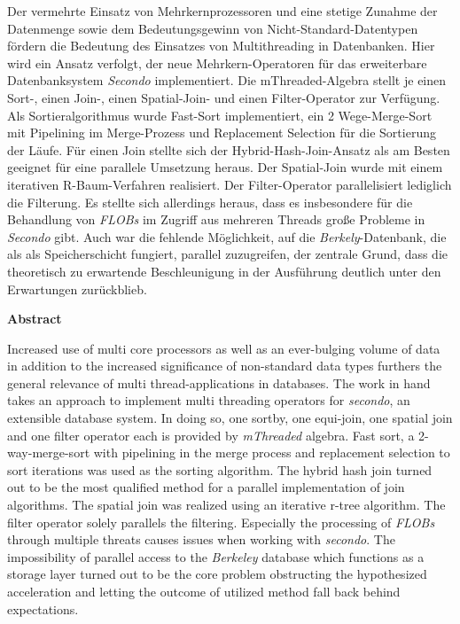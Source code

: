 \documentclass[a4paper,12pt,twoside]{article}
\newcommand{\Fb}[1]{\textit{#1}} %
\begin{document}
Der vermehrte Einsatz von Mehrkernprozessoren und eine stetige Zunahme der Datenmenge sowie dem Bedeutungsgewinn von Nicht-Standard-Datentypen fördern die Bedeutung des Einsatzes von Multithreading in Datenbanken. Hier wird ein Ansatz verfolgt, der neue Mehrkern-Operatoren für das erweiterbare Datenbanksystem \Fb{Secondo} implementiert. Die mThreaded-Algebra stellt je einen Sort-, einen Join-, einen Spatial-Join- und einen Filter-Operator zur Verfügung. Als Sortieralgorithmus wurde Fast-Sort implementiert, ein 2 Wege-Merge-Sort mit Pipelining im Merge-Prozess und Replacement Selection für die Sortierung der Läufe. Für einen Join stellte sich der Hybrid-Hash-Join-Ansatz als am Besten geeignet für eine parallele Umsetzung heraus. Der Spatial-Join wurde mit einem iterativen R-Baum-Verfahren realisiert. Der Filter-Operator parallelisiert lediglich die Filterung. Es stellte sich allerdings heraus, dass es insbesondere für die Behandlung von \Fb{FLOBs} im Zugriff aus mehreren Threads große Probleme in \Fb{Secondo} gibt. Auch war die fehlende Möglichkeit, auf die \Fb{Berkely}-Datenbank, die als als Speicherschicht fungiert, parallel zuzugreifen, der zentrale Grund, dass die theoretisch zu erwartende Beschleunigung in der Ausführung deutlich unter den Erwartungen zurückblieb.
\bigskip

\textbf{Abstract}

Increased use of multi core processors as well as an ever-bulging volume of data in addition to the increased significance of non-standard data types furthers the general relevance of multi thread-applications in databases. The work in hand takes an approach to implement multi threading operators for \Fb{secondo}, an extensible database system. In doing so, one sortby, one equi-join, one spatial join and one filter operator each is provided by \Fb{mThreaded} algebra. Fast sort, a 2-way-merge-sort with pipelining in the merge process and replacement selection to sort iterations was used as the sorting algorithm. The hybrid hash join turned out to be the most qualified method for a parallel implementation of join algorithms. The spatial join was realized using an iterative r-tree algorithm. The filter operator solely parallels the filtering. Especially the processing of \Fb{FLOBs} through multiple threats causes issues when working with \Fb{secondo}. The impossibility of parallel access to the \Fb{Berkeley} database which functions as a storage layer turned out to be the core problem obstructing the hypothesized acceleration and letting the outcome of utilized method fall back behind expectations.
\end{document}
